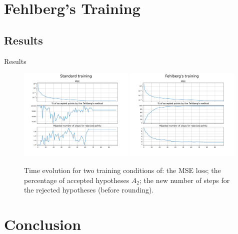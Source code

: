 \documentclass{EESD}
\begin{document}
\section{Fehlberg's Training}

\subsection{Results}
\begin{frame}{Results}
    \begin{figure}
        \centering
        \includegraphics[width=0.49\textwidth]{batch_training.pdf}
        \includegraphics[width=0.49\textwidth]{fehlberg_training.pdf}
        \caption{Time evolution for two training conditions of: the MSE loss; the percentage of accepted hypotheses $A_2$; the new number of steps for the rejected hypotheses (before rounding).}
        \label{fig:lorenz_error}
    \end{figure}                                                    
\end{frame}


\section{Conclusion}
\end{document}
